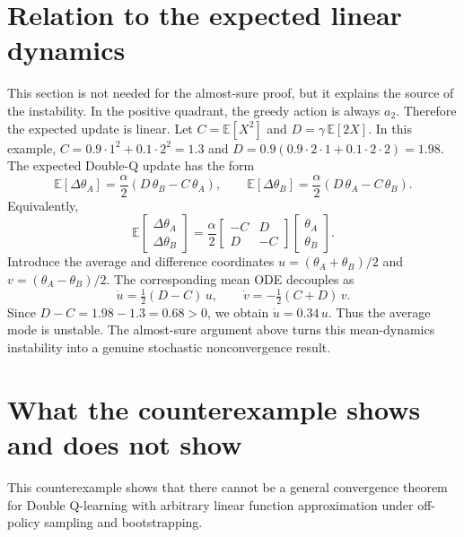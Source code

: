 \documentclass[11pt]{article}
\begin{document}
\section{Relation to the expected linear dynamics}

This section is not needed for the almost-sure proof, but it explains the source of the instability. In the positive quadrant, the greedy action is always $a_2$. Therefore the expected update is linear. Let $C = \mathbb{E}[X^2]$ and $D = \gamma\,\mathbb{E}[2X]$. In this example, $C = 0.9 \cdot 1^2 + 0.1 \cdot 2^2 = 1.3$ and $D = 0.9(0.9 \cdot 2 \cdot 1 + 0.1 \cdot 2 \cdot 2) = 1.98$. The expected Double-Q update has the form
\begin{equation}
\mathbb{E}[\Delta \theta_A] = \frac{\alpha}{2}(D\,\theta_B - C\,\theta_A),
\qquad
\mathbb{E}[\Delta \theta_B] = \frac{\alpha}{2}(D\,\theta_A - C\,\theta_B).
\end{equation}
Equivalently,
\begin{equation}\label{eq:matrix-dynamics}
\mathbb{E}
\begin{bmatrix}
\Delta \theta_A \\
\Delta \theta_B
\end{bmatrix}
= \frac{\alpha}{2}
\begin{bmatrix}
-C & D \\
D & -C
\end{bmatrix}
\begin{bmatrix}
\theta_A \\
\theta_B
\end{bmatrix}.
\end{equation}
Introduce the average and difference coordinates $u = (\theta_A + \theta_B)/2$ and $v = (\theta_A - \theta_B)/2$. The corresponding mean ODE decouples as
\begin{equation}\label{eq:ode}
\dot{u} = \tfrac{1}{2}(D - C)\,u, \qquad \dot{v} = -\tfrac{1}{2}(C + D)\,v.
\end{equation}
Since $D - C = 1.98 - 1.3 = 0.68 > 0$, we obtain $\dot{u} = 0.34\,u$. Thus the average mode is unstable. The almost-sure argument above turns this mean-dynamics instability into a genuine stochastic nonconvergence result.

\section{What the counterexample shows and does not show}

This counterexample shows that there cannot be a general convergence theorem for Double Q-learning with arbitrary linear function approximation under off-policy sampling and bootstrapping.
\end{document}
